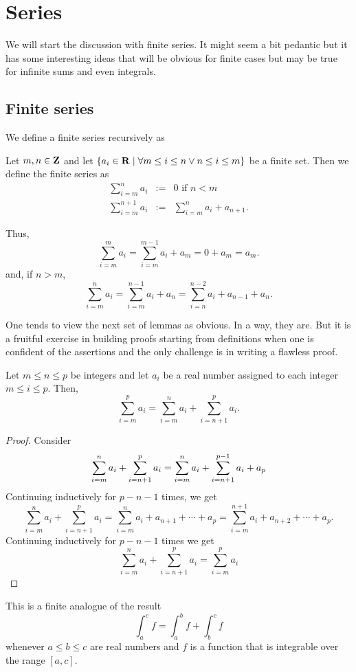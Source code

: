 \chapter{Series}\label{c6}
We will start the discussion with finite series. It might seem a bit 
pedantic but it has some interesting ideas that will be obvious for finite
cases but may be true for infinite sums and even integrals.
\section{Finite series}\label{c6s1}
We define a finite series recursively as
\begin{defn}\label{c6s1d1}
Let $m, n \in \mathbf{Z}$ and let $\{a_i \in \mathbf{R} \;|\; \forall m \le i \le n \lor
n \le i \le m\}$ be a finite set. Then we define the finite series as
\begin{eqnarray*}
\sum_{i=m}^n a_i &:=& 0 \text{ if } n < m \\
\sum_{i=m}^{n+1} a_i &:=& \sum_{i=m}^n a_i + a_{n+1}.
\end{eqnarray*}
\end{defn}
Thus,
\[
\sum_{i=m}^m a_i = \sum_{i=m}^{m-1} a_i + a_m = 0 + a_m = a_m.
\]
and, if $n > m$,
\[
\sum_{i=m}^{n} a_i = \sum_{i=m}^{n-1}a_i + a_n = \sum_{i=n}^{n-2}a_i + 
a_{n-1} + a_n.
\]

One tends to view the next set of lemmas as obvious. In a way, they are. 
But it is a fruitful exercise in building proofs starting from definitions
when one is confident of the assertions and the only challenge is in writing
a flawless proof.

\begin{lem}\label{c6s1l1}
Let $m \le n \le p$ be integers and let $a_i$ be a real number assigned to 
each integer $m \le i \le p$. Then,
\[
\sum_{i=m}^p a_i = \sum_{i=m}^n a_i + \sum_{i=n+1}^p a_i.
\]
\end{lem}
\begin{proof}
Consider
\[
\sum_{i=m}^n a_i + \sum_{i=n+1}^p a_i = \sum_{i=m}^n a_i + 
    \sum_{i=n+1}^{p-1} a_i + a_p \\
\]
Continuing inductively for $p - n - 1$ times, we get
\[
\sum_{i=m}^n a_i + \sum_{i=n+1}^p a_i = \sum_{i=m}^n a_i + 
    a_{n+1} + \cdots + a_p = \sum_{i=m}^{n+1} a_i + a_{n+2} + \cdots + a_p.
\]
Continuing inductively for $p - n - 1$ times we get
\[
\sum_{i=m}^n a_i + \sum_{i=n+1}^p a_i = \sum_{i=m}^{p} a_i 
\]
\end{proof}
\begin{rem}
This is a finite analogue of the result
\[
\int_a^c f = \int_a^b f + \int_b^c f
\]
whenever $a \le b \le c$ are real numbers and $f$ is a function that is 
integrable over the range $[a, c]$.
\end{rem}

